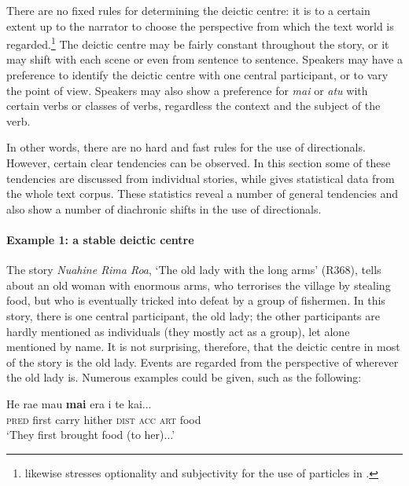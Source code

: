There are no fixed rules for determining the deictic centre: it is to a certain extent up to the narrator to choose the perspective from which the text world is regarded.\footnote{\label{fn:354}\citet[105]{Tchekhoff1990} likewise stresses optionality and subjectivity for the use of  particles in .} The deictic centre may be fairly constant throughout the story, or it may shift with each scene or even from sentence to sentence. Speakers may have a preference to identify the deictic centre with one central participant, or to vary the point of view. Speakers may also show a preference for \textit{mai} or \textit{atu} with certain verbs or classes of verbs, regardless the context and the subject of the verb. 

In other words, there are no hard and fast rules for the use of directionals. However, certain clear tendencies can be observed. In this section some of these tendencies are discussed from individual stories, while  gives statistical data from the whole text corpus. These statistics reveal a number of general tendencies and also show a number of diachronic shifts in the use of directionals.

\paragraph[Example 1: a stable deictic centre]{Example 1: a stable deictic centre}\label{sec:7.5.1.2.1}

The story \textit{Nuahine Rima Roa}, ‘The old lady with the long arms’ (R368), tells about an old woman with enormous arms, who terrorises the village by stealing food, but who is eventually tricked into defeat by a group of fishermen. In this story, there is one central participant, the old lady; the other participants are hardly mentioned as individuals (they mostly act as a group), let alone mentioned by name. It is not surprising, therefore, that the deictic centre in most of the story is the old lady. Events are regarded from the perspective of wherever the old lady is. Numerous examples could be given, such as the following:

\ea\label{ex:7.134}
\gll He ra{\ꞌ}e ma{\ꞌ}u \textbf{mai} era i te kai... \\
\textsc{pred} first carry hither \textsc{dist} \textsc{acc} \textsc{art} food \\

\glt 
‘They first brought food (to her)...’ \textstyleExampleref{[R368.006]} 
\z

